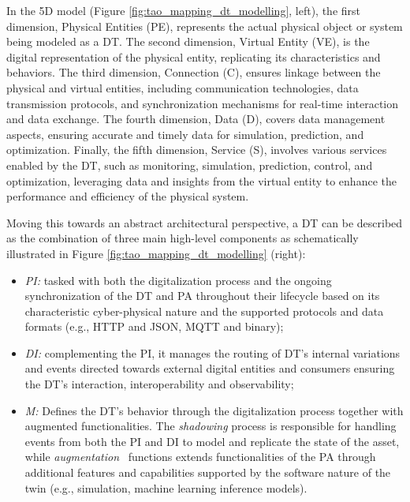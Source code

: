 In the 5D model (Figure \ref{fig:tao_mapping_dt_modelling}, left), 
the first dimension, Physical Entities (PE), represents the actual physical object or system being modeled as a \ac{DT}.
The second dimension, Virtual Entity (VE), is the digital representation of the physical entity, replicating its characteristics and behaviors.
The third dimension, Connection (C), ensures linkage between the physical and virtual entities, including communication technologies, data transmission protocols, and synchronization mechanisms for real-time interaction and data exchange.
The fourth dimension, Data (D), covers data management aspects, ensuring accurate and timely data for simulation, prediction, and optimization.
Finally, the fifth dimension, Service (S), involves various services enabled by the \ac{DT}, such as monitoring, simulation, prediction, control, and optimization, leveraging data and insights from the virtual entity to enhance the performance and efficiency of the physical system.

Moving this towards an abstract architectural perspective, a \ac{DT} can be described as the combination of three main high-level components as schematically illustrated in Figure \ref{fig:tao_mapping_dt_modelling} (right): 

\begin{itemize}
    \item \textit{\ac{PI}:} tasked with both the digitalization process and the ongoing synchronization of the \ac{DT} and \ac{PA} throughout their lifecycle based on its characteristic cyber-physical nature and the supported protocols and data formats (e.g., HTTP and JSON, MQTT and binary);
    \item \textit{\ac{DI}:} complementing the \ac{PI}, it manages the routing of \ac{DT}'s internal variations and events directed towards external digital entities and consumers ensuring the \ac{DT}'s interaction, interoperability and observability;
    \item  \textit{\ac{M}:} Defines the \ac{DT}'s behavior through the digitalization process together with augmented functionalities.
    The \textit{shadowing} process is responsible for handling events from both the \ac{PI} and \ac{DI} to model and replicate the state of the asset,
    while \textit{augmentation}~\cite{dt-IoT-context-Minerva-2020} functions extends functionalities of the \ac{PA} through additional features and capabilities supported by the software nature of the twin (e.g., simulation, machine learning inference models).
\end{itemize}


